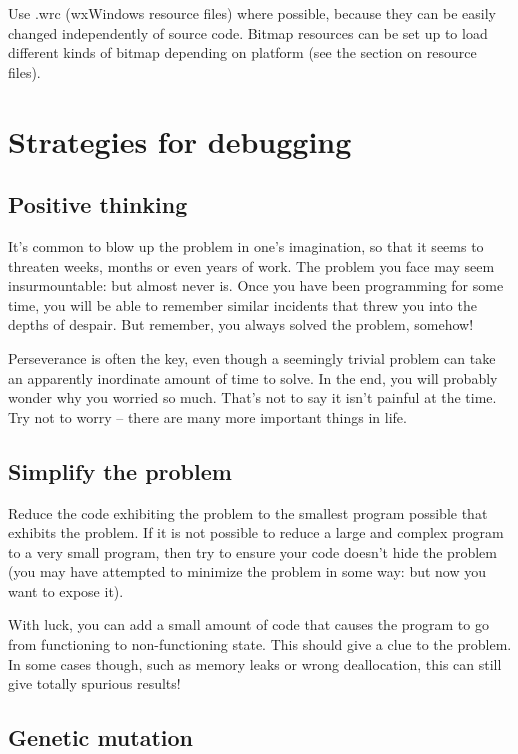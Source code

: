 Use .wrc (wxWindows resource files) where possible, because they can be easily changed
independently of source code. Bitmap resources can be set up to load different
kinds of bitmap depending on platform (see the section on resource files).

\section{Strategies for debugging}

\subsection{Positive thinking}

It's common to blow up the problem in one's imagination, so that it seems to threaten
weeks, months or even years of work. The problem you face may seem insurmountable:
but almost never is. Once you have been programming for some time, you will be able
to remember similar incidents that threw you into the depths of despair. But
remember, you always solved the problem, somehow!

Perseverance is often the key, even though a seemingly trivial problem
can take an apparently inordinate amount of time to solve. In the end,
you will probably wonder why you worried so much. That's not to say it
isn't painful at the time. Try not to worry -- there are many more important
things in life.

\subsection{Simplify the problem}

Reduce the code exhibiting the problem to the smallest program possible
that exhibits the problem. If it is not possible to reduce a large and
complex program to a very small program, then try to ensure your code
doesn't hide the problem (you may have attempted to minimize the problem
in some way: but now you want to expose it).

With luck, you can add a small amount of code that causes the program
to go from functioning to non-functioning state. This should give a clue
to the problem. In some cases though, such as memory leaks or wrong
deallocation, this can still give totally spurious results!

\subsection{Genetic mutation}

